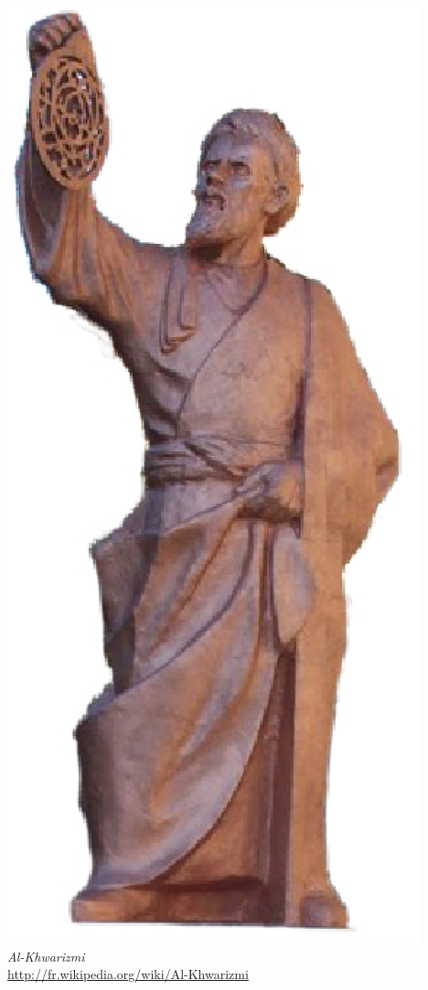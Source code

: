 \documentclass[letterpaper, 12pt]{article}
\begin{document}
\begin{center}
\includegraphics[scale=0.25]{Al-Khwarizmi.eps}\\
\emph{{\small Al-Khwarizmi}}\\
\href{http://fr.wikipedia.org/wiki/Al-Khwarizmi}{http://fr.wikipedia.org/wiki/Al-Khwarizmi}\\[5mm]
\end{center}
\end{document}
